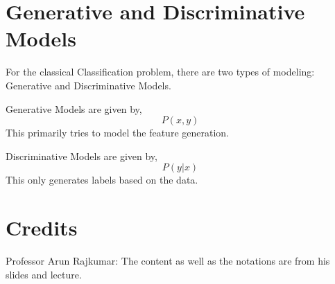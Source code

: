 \documentclass[
]{article}
\begin{document}
\hypertarget{generative-and-discriminative-models}{%
\section{Generative and Discriminative
Models}\label{generative-and-discriminative-models}}

For the classical Classification problem, there are two types of
modeling: Generative and Discriminative Models.

Generative Models are given by, \[
P(x,y)
\] This primarily tries to model the feature generation.

Discriminative Models are given by, \[
P(y|x)
\] This only generates labels based on the data.

\hypertarget{credits}{%
\section{Credits}\label{credits}}

Professor Arun Rajkumar: The content as well as the notations are from
his slides and lecture.
\end{document}

